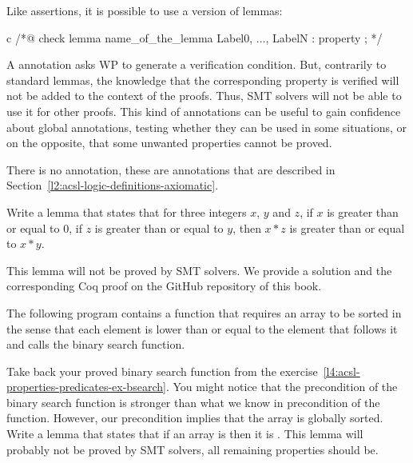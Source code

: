 Like assertions, it is possible to use a  version of lemmas:


\begin{CodeBlock}{c}
/*@
  check lemma name_of_the_lemma { Label0, ..., LabelN }:
    property ;
*/
\end{CodeBlock}


A  annotation asks WP to generate a verification
condition. But, contrarily to standard lemmas, the knowledge that the
corresponding property is verified will not be added to the context of the
proofs. Thus, SMT solvers will not be able to use it for other proofs. This
kind of annotations can be useful to gain confidence about global annotations,
testing whether they can be used in some situations, or on the opposite, that
some unwanted properties cannot be proved.


There is no  annotation, these are 
annotations that are described in
Section~\ref{l2:acsl-logic-definitions-axiomatic}.








Write a lemma that states that for three integers $x$, $y$ and $z$, if $x$ is
greater than or equal to $0$, if $z$ is greater than or equal to $y$, then
$x * z$ is greater than or equal to $x * y$.


This lemma will not be proved by SMT solvers. We provide a solution and the
corresponding Coq proof on the GitHub repository of this book.


\label{l4:acsl-properties-lemmas-lsorted-gsorted}


The following program contains a function that requires an array to be sorted
in the sense that each element is lower than or equal to the element that
follows it and calls the binary search function.




Take back your proved binary search function from the
exercise~\ref{l4:acsl-properties-predicates-ex-bsearch}. You might notice that
the precondition of the binary search function is stronger than what we know in
precondition of the  function. However, our precondition
implies that the array is globally sorted. Write a lemma that states that if
an array is  then it is .
This lemma will probably not be proved by SMT solvers, all remaining properties
should be.

